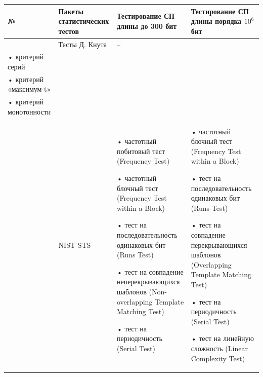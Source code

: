 {\def\LTcaptype{none}%
\begin{longtable}[]{@{}|%
  >{\raggedright\arraybackslash}p{}|%
  >{\raggedright\arraybackslash}p{}|%
  >{\raggedright\arraybackslash}p{}|%
  >{\raggedright\arraybackslash}p{}|@{}}
\hline
\begin{minipage}[b]{\hsize}\raggedright
№
\end{minipage} & \begin{minipage}[b]{\hsize}\raggedright
Пакеты ста\-тис\-ти\-чес\-ких тестов
\end{minipage} & \begin{minipage}[b]{\hsize}\raggedright
Тестирование СП длины до 300 бит
\end{minipage} & \begin{minipage}[b]{\hsize}\raggedright
Тестирование СП длины порядка $10^6$ бит
\end{minipage} \\ \hline
\endhead
\endlastfoot
1 & Тесты Д. Кнута & -- & \begin{minipage}[t]{\hsize}\raggedright• критерий частот\\
• критерий серий\\
• критерий «максимум-t»\\
• критерий монотонности\strut
\end{minipage} \\ \hline
2 & NIST STS &
• частотный побитовый тест (Frequency Test)\par
• частотный блочный тест (Frequency Test within a Block)\par
• тест на последовательность одинаковых бит (Runs Test)\par
• тест на совпадение неперекрывающихся шаблонов (Non-overlapping
Template Matching Test)\par
• тест на периодичность (Serial Test)
&
• частотный блочный тест (Frequency Test within a Block)\par
• тест на последовательность одинаковых бит (Runs Test)\par
• тест на совпадение перекрывающихся шаблонов (Overlapping Template
Matching Test)\par
• тест на периодичность (Serial Test)\par
• тест на линейную сложность (Linear Complexity Test)
\\ \hline

\end{longtable}}
